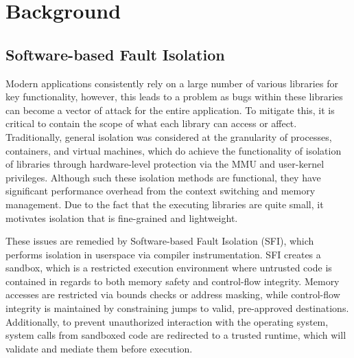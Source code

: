 \documentclass[conference,compsoc]{IEEEtran}
\begin{document}
\section{Background}
\subsection{Software-based Fault Isolation}
Modern applications consistently rely on a large number of various libraries for key functionality, however, this leads to a problem as bugs within these libraries can become a vector of attack for the entire application.
To mitigate this, it is critical to contain the scope of what each library can access or affect.
Traditionally, general isolation was considered at the granularity of processes, containers, and virtual machines, which do achieve the functionality of isolation of libraries through hardware-level protection via the MMU and user-kernel privileges.
Although such these isolation methods are functional, they have significant performance overhead from the context switching and memory management. 
Due to the fact that the executing libraries are quite small, it motivates isolation that is fine-grained and lightweight.

These issues are remedied by Software-based Fault Isolation (SFI), which performs isolation in userspace via compiler instrumentation.
SFI creates a sandbox, which is a restricted execution environment where untrusted code is contained in regards to both memory safety and control-flow integrity.
Memory accesses are restricted via bounds checks or address masking, while control-flow integrity is maintained by constraining jumps to valid, pre-approved destinations.
Additionally, to prevent unauthorized interaction with the operating system, system calls from sandboxed code are redirected to a trusted runtime, which will validate and mediate them before execution.
\end{document}
